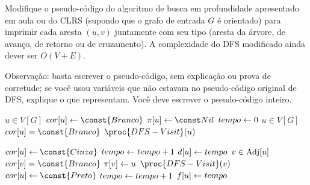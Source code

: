 Modifique o pseudo-código do algoritmo de busca em profundidade apresentado em aula ou do CLRS (supondo que o grafo de entrada $G$ é orientado) para imprimir cada aresta $(u, v)$ juntamente com seu tipo (aresta da árvore, de avanço, de retorno ou de cruzamento). A complexidade do DFS modificado ainda dever ser $O(V + E)$.

Observação: basta escrever o pseudo-código, sem explicação ou prova de corretude; se você usou variáveis que não estavam no pseudo-código original de DFS, explique o que representam. Você deve escrever o pseudo-código inteiro.

\itemdsep

\newcommand{\Branco}{\const{Branco}\xspace}
\newcommand{\Cinza}{\const{Cinza}\xspace}
\newcommand{\Preto}{\const{Preto}\xspace}

\begin{codebox}
\li \Para \Cada $u \in V[G]$ \Faca
    \Do
\li     $cor[u] \Recebe \Branco$
\li     $\pi[u] \Recebe \Nulo$
    \End
\li $tempo \leftarrow 0$
\li \Para \Cada $u \in V[G]$ \Faca
    \Do
\li     \Se $cor[u] = \Branco$
        \Do
\li         \Entao $\proc{DFS-Visit}(u)$
        \End
    \End
\end{codebox}

\begin{codebox}
\li $cor[u] \Recebe \Cinza$
\li $tempo \leftarrow tempo + 1$
\li $d[u] \leftarrow tempo$
\li \Para \Cada $v \in \operatorname{Adj}[u]$
    \Do
\li     \Se $cor[v] = \Branco$ \Entao
        \Do
\li         \Entao
            \Do
\li             $\pi[v] \leftarrow u$
\li             $\proc{DFS-Visit}(v)$
            \End
        \End
    \End
\li $cor[u] \Recebe \Preto$
\li $tempo \leftarrow tempo + 1$
\li $f[u] \leftarrow tempo$
\end{codebox}
